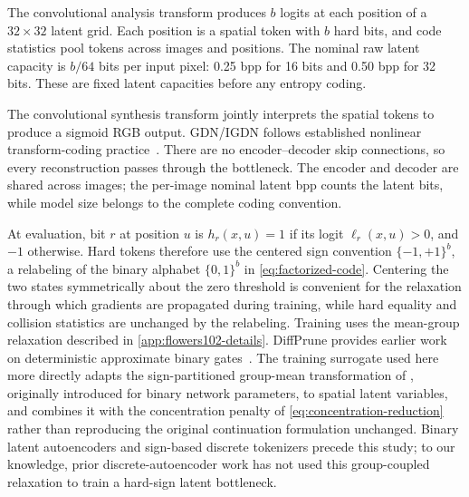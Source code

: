 The convolutional analysis transform produces $b$ logits at each position of a $32\times32$ latent grid.
Each position is a spatial token with $b$ hard bits, and code statistics pool tokens across images and positions.
The nominal raw latent capacity is $b/64$ bits per input pixel: 0.25 bpp for 16 bits and 0.50 bpp for 32 bits.
These are fixed latent capacities before any entropy coding.

The convolutional synthesis transform jointly interprets the spatial tokens to produce a sigmoid RGB output.
GDN/IGDN follows established nonlinear transform-coding practice~\citep{balle2017end}.
There are no encoder--decoder skip connections, so every reconstruction passes through the bottleneck.
The encoder and decoder are shared across images; the per-image nominal latent bpp counts the latent bits, while model size belongs to the complete coding convention.

At evaluation, bit $r$ at position $u$ is $h_r(x,u)=1$ if its logit $\ell_r(x,u)>0$, and $-1$ otherwise.
Hard tokens therefore use the centered sign convention $\{-1,+1\}^b$, a relabeling of the binary alphabet $\{0,1\}^b$ in \cref{eq:factorized-code}.
Centering the two states symmetrically about the zero threshold is convenient for the relaxation through which gradients are propagated during training, while hard equality and collision statistics are unchanged by the relabeling.
Training uses the mean-group relaxation described in \ref{app:flowers102-details}.
DiffPrune provides earlier work on deterministic approximate binary gates~\citep{shulman2020diffprune}.
The training surrogate used here more directly adapts the sign-partitioned group-mean transformation of \citet{shulman2021exact}, originally introduced for binary network parameters, to spatial latent variables, and combines it with the concentration penalty of \cref{eq:concentration-reduction} rather than reproducing the original continuation formulation unchanged.
Binary latent autoencoders and sign-based discrete tokenizers precede this study; to our knowledge, prior discrete-autoencoder work has not used this group-coupled relaxation to train a hard-sign latent bottleneck.

